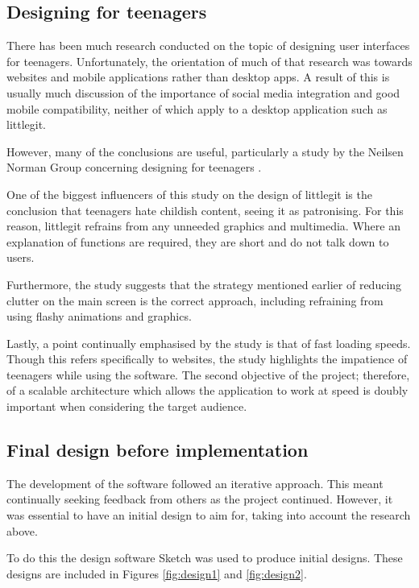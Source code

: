 \subsection {Designing for teenagers}

There has been much research conducted on the topic of designing user interfaces for teenagers. Unfortunately, the orientation of much of that research was towards websites and mobile applications rather than desktop apps. A result of this is usually much discussion of the importance of social media integration and good mobile compatibility, neither of which apply to a desktop application such as littlegit.

However, many of the conclusions are useful, particularly a study by the Neilsen Norman Group concerning designing for teenagers \cite{teendesign}. 

One of the biggest influencers of this study on the design of littlegit is the conclusion that teenagers hate childish content, seeing it as patronising. For this reason, littlegit refrains from any unneeded graphics and multimedia. Where an explanation of functions are required, they are short and do not talk down to users.

Furthermore, the study suggests that the strategy mentioned earlier of reducing clutter on the main screen is the correct approach, including refraining from using flashy animations and graphics.

Lastly, a point continually emphasised by the study is that of fast loading speeds. Though this refers specifically to websites, the study highlights the impatience of teenagers while using the software.  The second objective of the project; therefore, of a scalable architecture which allows the application to work at speed is doubly important when considering the target audience.

\subsection{Final design before implementation}

The development of the software followed an iterative approach. This meant continually seeking feedback from others as the project continued. However, it was essential to have an initial design to aim for, taking into account the research above.

To do this the design software Sketch \cite{sketch} was used to produce initial designs. These designs are included in Figures \ref{fig:design1} and \ref{fig:design2}.





